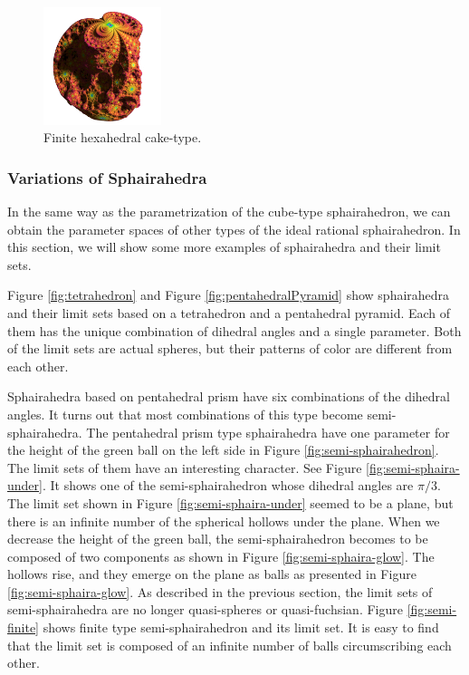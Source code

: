 \begin{figure}[htbp]
\begin{minipage}[t]{0.5\textwidth}
  \begin{minipage}[t]{0.24\textwidth}
   \centering
   \includegraphics[width=1.35in, height=1.35in, keepaspectratio]{./img/application/sphairahedron/variations/hexahedralCake2/finiteLimit.png}
  \end{minipage}
  \hspace*{\fill}
  \caption{Finite hexahedral cake-type.}
  \label{fig:cake-limit-finite}
 \end{minipage}
\end{figure}

\subsubsection{Variations of Sphairahedra}

\noindent
In the same way as the parametrization of the cube-type sphairahedron, we
can obtain the parameter spaces of other types of the
ideal rational sphairahedron.
In this section, we will show some more examples of sphairahedra and
their limit sets.

Figure \ref{fig:tetrahedron} and Figure \ref{fig:pentahedralPyramid}
show sphairahedra and their limit sets based on a tetrahedron and
a pentahedral pyramid.
Each of them has the unique combination of dihedral angles and a single
parameter.
Both of the limit sets are actual spheres, but their patterns of color
are different from each other.

Sphairahedra based on pentahedral prism have six combinations of the
dihedral angles.
It turns out that most combinations of this type become
semi-sphairahedra.
The pentahedral prism type sphairahedra have one parameter for the
height of the green ball on the left side in Figure
\ref{fig:semi-sphairahedron}.
The limit sets of them have an interesting character.
See Figure \ref{fig:semi-sphaira-under}.
It shows one of the semi-sphairahedron whose dihedral angles are $\pi / 3$.
The limit set shown in Figure
\ref{fig:semi-sphaira-under} seemed
to be a plane, but there is an infinite number of the spherical hollows
under the plane.
When we decrease the height of the green ball, the semi-sphairahedron
becomes to be composed of two components as shown in Figure
\ref{fig:semi-sphaira-glow}.
The hollows rise, and they emerge on the plane as balls
as presented in Figure
\ref{fig:semi-sphaira-glow}.
As described in the previous section, the limit sets of semi-sphairahedra
are no longer quasi-spheres or quasi-fuchsian.
Figure \ref{fig:semi-finite} shows finite type semi-sphairahedron
and its limit set.
It is easy to find that the limit set is composed of an infinite number
of balls circumscribing each other.

